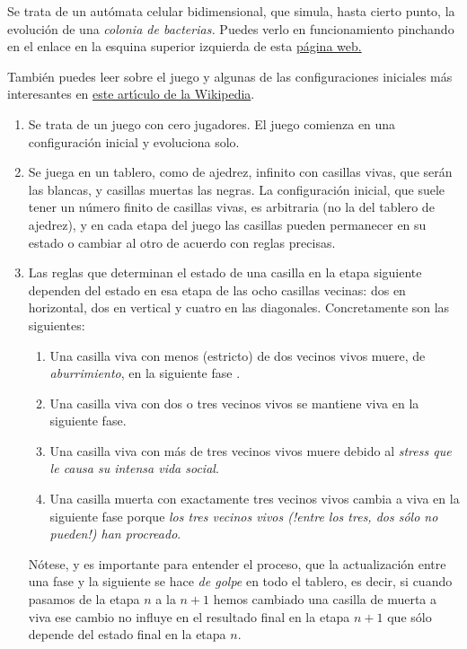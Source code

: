 Se trata de un aut\'omata celular bidimensional, que simula, hasta cierto 
punto, 
 la evoluci\'on de una {\itshape colonia de bacterias.} Puedes verlo en 
funcionamiento pinchando en el enlace en la esquina superior izquierda de esta  
\href{http://www.ibiblio.org/lifepatterns/}{p\'agina web.}

Tambi\'en puedes leer sobre el juego y algunas de las configuraciones iniciales 
m\'as interesantes en 
\href{http://150.244.21.37/PDFs/MISCE/Conway_life.pdf}{este art\'{\i}culo de la Wikipedia}. 


\begin{enumerate}
 \item Se trata de un juego con cero jugadores. El juego comienza en una
configuraci\'on inicial y evoluciona solo.
 \item Se juega en un tablero, como de ajedrez,  infinito con casillas vivas,
que ser\'an las blancas,  y casillas muertas las negras. La configuraci\'on
inicial, que suele tener un n\'umero finito de casillas vivas,  es arbitraria
(no la del tablero de ajedrez), y en cada etapa del juego las casillas pueden
permanecer en su estado o cambiar al otro de acuerdo con reglas precisas. 
 \item Las reglas que determinan el estado de una casilla en la etapa siguiente
dependen del estado en esa etapa de las ocho casillas vecinas: dos en
horizontal, dos en vertical y cuatro en las diagonales. Concretamente son las
siguientes:
 \begin{enumerate}
  \item Una casilla viva con menos (estricto) de dos vecinos vivos muere, de 
{\itshape aburrimiento}, en la
siguiente fase .
  \item Una casilla viva con dos o tres vecinos vivos se mantiene viva en la
siguiente fase.
  \item Una casilla viva con m\'as de tres vecinos vivos muere debido al
{\itshape stress que le causa su intensa vida social}.
  \item Una casilla muerta con exactamente tres vecinos vivos cambia a viva en
la siguiente fase porque {\itshape los tres vecinos vivos (!entre los tres, dos 
s\'olo
no pueden!) han procreado}.
 \end{enumerate}

 {\sc N\'otese}, y es importante para entender el proceso, que la
actualizaci\'on entre una fase y la siguiente se hace {\itshape de golpe} en 
todo el
tablero, es decir, si cuando pasamos de la etapa $n$ a la $n+1$ hemos cambiado
una casilla de muerta a viva ese cambio no influye en el resultado final en la
etapa $n+1$ que s\'olo depende del estado final en la etapa $n$. 
 

\end{enumerate}
